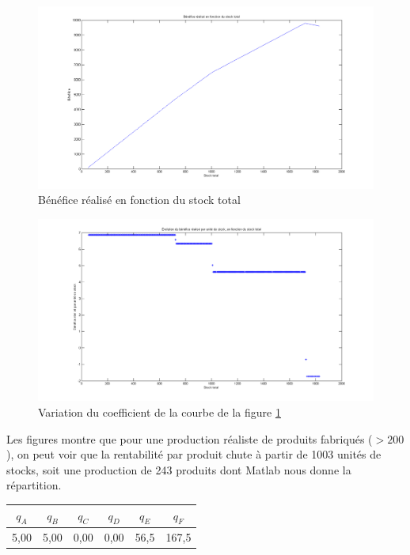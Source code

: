 \documentclass[paper=a4, fontsize=11pt]{scrartcl}
\numberwithin{equation}{section}		%
\numberwithin{figure}{section}			%
\numberwithin{table}{section}				%
\begin{document}
\begin{figure}[H]
\caption{Bénéfice réalisé en fonction du stock total \label{figben}}
\centering
\includegraphics[width=16cm]{figures/BenefFctStockTotal.png}
\end{figure}

\begin{figure}[H]
\caption{Variation du coefficient de la courbe de la figure \ref{figben}}
\centering
\includegraphics[width=16cm]{figures/BenefFctStockTotal_Coeff.png}
\end{figure}


Les figures montre que pour une production réaliste de produits fabriqués ($> 200$), on peut voir que la rentabilité par produit chute à partir de 1003 unités de stocks, soit une production de 243 produits dont Matlab nous donne la répartition.

\begin{center}
\begin{tabular}{cccccc}
\hline 
$q_A$ & $q_B$ & $q_C$ & $q_D$ & $q_E$ & $q_F$ \\ 
\hline 
5,00 & 5,00 & 0,00 & 0,00 & 56,5 & 167,5 \\ 
\hline 
\end{tabular} 
\end{center}
\end{document}

